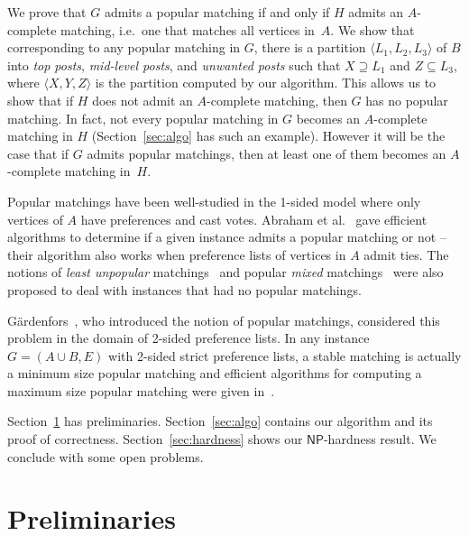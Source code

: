 \documentclass[11pt]{llncs}
\begin{document}
We prove that $G$ admits a popular matching if and only if $H$ admits an $A$-complete matching,
i.e.\ one that matches all vertices in~$A$. We show that corresponding 
to any popular matching in $G$, there is a partition $\langle L_1,L_2,L_3\rangle$ of $B$ into 
{\em top posts}, {\em mid-level posts}, and {\em unwanted posts} such that $X \supseteq L_1$ 
and $Z \subseteq L_3$, where $\langle X,Y,Z\rangle$ is the partition computed by our algorithm.
This allows us to show that if $H$ does not admit an $A$-complete matching, then $G$ has no 
popular matching. In fact, not every popular matching in $G$ becomes an $A$-complete matching 
in $H$ (Section~\ref{sec:algo} has such an example). However it will be the case that if $G$ 
admits popular matchings, then at least one of them becomes an $A$-complete matching in~$H$.



\medskip

 Popular matchings have been well-studied in the 1-sided model 
\cite{AIKM05,KN08,Mah06,MS06,MI09,Mes06} where only vertices of $A$ have preferences and cast votes. 
Abraham et al.~\cite{AIKM05} gave efficient algorithms to determine if a given instance admits a 
popular matching or not -- their algorithm also works when preference lists of vertices in $A$ admit ties. 
The notions of {\em least unpopular} matchings~\cite{McC06} and popular {\em mixed} matchings~\cite{KMN09} 
were also proposed to deal with instances that had no popular matchings.

G\"ardenfors~\cite{Gar75}, who introduced the notion of popular matchings, considered
this problem in the domain of 2-sided preference lists. In any instance $G = (A \cup B,E)$ 
with 2-sided strict preference lists, a stable matching is actually a minimum size popular matching
and efficient algorithms for computing a maximum size popular matching were given in~\cite{HK11,Kav12}. 

\medskip

 Section~\ref{sec:prelims} has preliminaries.
Section~\ref{sec:algo} contains our algorithm and its proof of correctness. Section~\ref{sec:hardness}
shows our $\mathsf{NP}$-hardness result. We conclude with some open problems.

\section{Preliminaries}
\label{sec:prelims}
\end{document}
